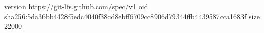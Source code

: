 version https://git-lfs.github.com/spec/v1
oid sha256:5da36bb4428f5edc4040f38cd8ebff6709cc8906d79344ffb4439587cca1683f
size 22000
